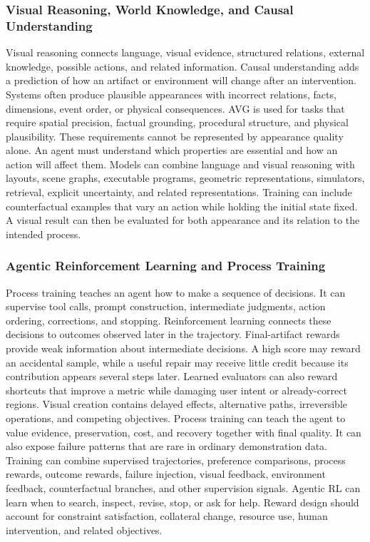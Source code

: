 \subsubsection{Visual Reasoning, World Knowledge, and Causal Understanding}

Visual reasoning connects language, visual evidence, structured relations, external knowledge, possible actions, and related information. Causal understanding adds a prediction of how an artifact or environment will change after an intervention. Systems often produce plausible appearances with incorrect relations, facts, dimensions, event order, or physical consequences. AVG is used for tasks that require spatial precision, factual grounding, procedural structure, and physical plausibility. These requirements cannot be represented by appearance quality alone. An agent must understand which properties are essential and how an action will affect them. Models can combine language and visual reasoning with layouts, scene graphs, executable programs, geometric representations, simulators, retrieval, explicit uncertainty, and related representations. Training can include counterfactual examples that vary an action while holding the initial state fixed. A visual result can then be evaluated for both appearance and its relation to the intended process.


\subsubsection{Agentic Reinforcement Learning and Process Training}

Process training teaches an agent how to make a sequence of decisions. It can supervise tool calls, prompt construction, intermediate judgments, action ordering, corrections, and stopping. Reinforcement learning connects these decisions to outcomes observed later in the trajectory. Final-artifact rewards provide weak information about intermediate decisions. A high score may reward an accidental sample, while a useful repair may receive little credit because its contribution appears several steps later. Learned evaluators can also reward shortcuts that improve a metric while damaging user intent or already-correct regions. Visual creation contains delayed effects, alternative paths, irreversible operations, and competing objectives. Process training can teach the agent to value evidence, preservation, cost, and recovery together with final quality. It can also expose failure patterns that are rare in ordinary demonstration data. Training can combine supervised trajectories, preference comparisons, process rewards, outcome rewards, failure injection, visual feedback, environment feedback, counterfactual branches, and other supervision signals. Agentic RL can learn when to search, inspect, revise, stop, or ask for help. Reward design should account for constraint satisfaction, collateral change, resource use, human intervention, and related objectives.


